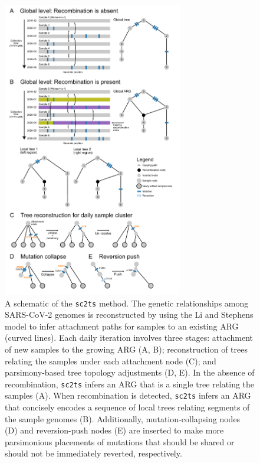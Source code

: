 \documentclass{article}
\begin{document}
\begin{figure} \centering
\includegraphics[width=0.7\textwidth]{figures/overview_sc2ts.pdf}
\caption{\label{fig:overview_sc2ts}
A schematic of the \texttt{sc2ts} method.
The genetic relationships among SARS-CoV-2 genomes is
reconstructed by using the Li and Stephens
model to infer attachment paths for samples to an existing ARG (curved lines).
Each daily iteration involves three stages:
attachment of new samples to the growing ARG (A, B);
reconstruction of trees relating the samples under each attachment node (C);
and parsimony-based tree topology adjustments (D, E).
In the absence of  recombination, \texttt{sc2ts}
infers an ARG that is a single tree relating the samples (A).
When recombination is detected, \texttt{sc2ts} infers
an ARG that concisely encodes a sequence of local trees relating segments
of the sample genomes (B). Additionally,
mutation-collapsing nodes (D) and reversion-push nodes (E) are inserted to
make more parsimonious placements of mutations that should be shared or should
not be immediately reverted, respectively.}
\end{figure}
\end{document}
